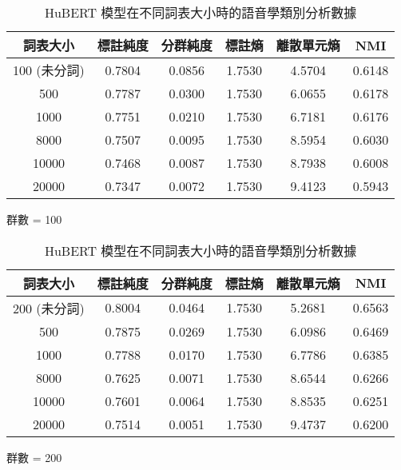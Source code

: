\begin{table}[!htbp]
            \begin{subtable}[t]{\textwidth}
                \centering
                \begin{tabular}{|c|c|c|c|c|c|} \hline 
                        詞表大小  & 標註純度 & 分群純度 & 標註熵 & 離散單元熵 &     NMI   \\ \hline 
 100 (未分詞)&              0.7804 &   0.0856 &         1.7530 &     4.5704 &  0.6148\\ \hline 
                           500    &  0.7787  &  0.0300  & 1.7530 &  6.0655  &     0.6178  \\ \hline 
                          1000    &  0.7751  &  0.0210  & 1.7530 &  6.7181  &     0.6176  \\ \hline 
                          8000    &  0.7507  &  0.0095  & 1.7530 &  8.5954  &     0.6030  \\ \hline 
                         10000    &  0.7468  &  0.0087  & 1.7530 &  8.7938  &     0.6008  \\ \hline 
                         20000    &  0.7347  &  0.0072  & 1.7530 &  9.4123  &     0.5943  \\ \hline 
                \end{tabular}
\caption{群數 = 100}
                \label{tab:ch4-hubert-pcls-clu100}
            \end{subtable}        

            \jefftablesep        

            \begin{subtable}[t]{\textwidth}
                \centering
                \begin{tabular}{|c|c|c|c|c|c|} \hline 
                        詞表大小  & 標註純度 & 分群純度 & 標註熵 & 離散單元熵 &     NMI   \\ \hline 
 200 (未分詞)&              0.8004 &   0.0464 &         1.7530 &     5.2681 &  0.6563\\ \hline 
                           500    &  0.7875  &  0.0269  & 1.7530 &  6.0986  &     0.6469  \\ \hline 
                          1000    &  0.7788  &  0.0170  & 1.7530 &  6.7786  &     0.6385  \\ \hline 
                          8000    &  0.7625  &  0.0071  & 1.7530 &  8.6544  &     0.6266  \\ \hline 
                         10000    &  0.7601  &  0.0064  & 1.7530 &  8.8535  &     0.6251  \\ \hline 
                         20000    &  0.7514  &  0.0051  & 1.7530 &  9.4737  &     0.6200   \\ \hline
                \end{tabular}
\caption{群數 = 200}
                \label{tab:ch4-hubert-pcls-clu200}
            \end{subtable}        

\caption{HuBERT 模型在不同詞表大小時的語音學類別分析數據}
            \label{tab:hubert-pcls-results}
        \end{table}


